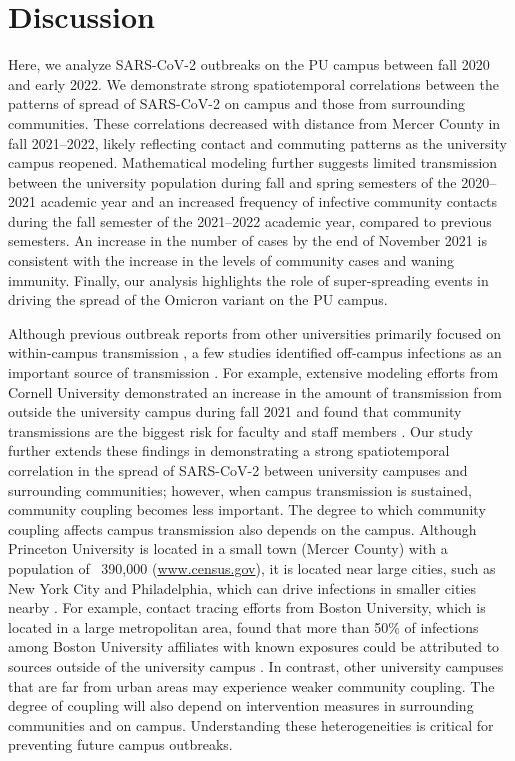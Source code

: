 \documentclass[12pt]{article}
\begin{document}
\section*{Discussion}

Here, we analyze SARS-CoV-2 outbreaks on the PU campus between fall 2020 and early 2022.
We demonstrate strong spatiotemporal correlations between the patterns of spread of SARS-CoV-2 on campus and those from surrounding communities.
These correlations decreased with distance from Mercer County in fall 2021--2022, likely reflecting contact and commuting patterns as the university campus reopened.
Mathematical modeling further suggests limited transmission between the university population during fall and spring semesters of the 2020--2021 academic year and an increased frequency of infective community contacts during the fall semester of the 2021--2022 academic year, compared to previous semesters.
An increase in the number of cases by the end of November 2021 is consistent with the increase in the levels of community cases and waning immunity.
Finally, our analysis highlights the role of super-spreading events in driving the spread of the Omicron variant on the PU campus.

Although previous outbreak reports from other universities primarily focused on within-campus transmission \citep{wilson2020multiple,currie2021interventions}, a few studies identified off-campus infections as an important source of transmission \citep{fox2021response,hamer2021assessment}.
For example, extensive modeling efforts from Cornell University demonstrated an increase in the amount of transmission from outside the university campus during fall 2021 and found that community transmissions are the biggest risk for faculty and staff members \citep{frazier2022modeling}.
Our study further extends these findings in demonstrating a strong spatiotemporal correlation in the spread of SARS-CoV-2 between university campuses and surrounding communities;
however, when campus transmission is sustained, community coupling becomes less important.
The degree to which community coupling affects campus transmission also depends on the campus. 
Although Princeton University is located in a small town (Mercer County) with a population of ~390,000 (\url{www.census.gov}), it is located near large cities, such as New York City and Philadelphia, which can drive infections in smaller cities nearby \citep{grenfell1997meta}.
For example, contact tracing efforts from Boston University, which is located in a large metropolitan area, found that more than 50\% of infections among Boston University affiliates with known exposures could be attributed to sources outside of the university campus \citep{hamer2021assessment}.
In contrast, other university campuses that are far from urban areas may experience weaker community coupling.
The degree of coupling will also depend on intervention measures in surrounding communities and on campus.
Understanding these heterogeneities is critical for preventing future campus outbreaks.
\end{document}
